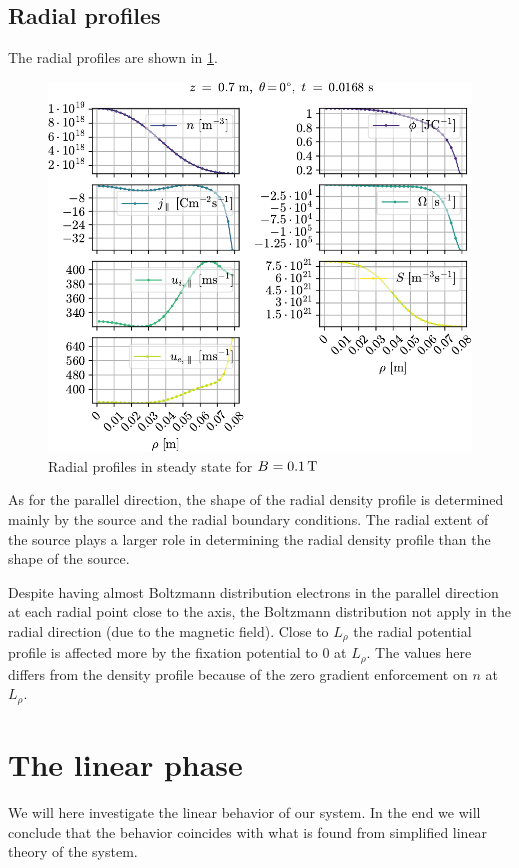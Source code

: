 \subsection{Radial profiles}
%
The radial profiles are shown in \cref{fig:radProfs}.
%
\begin{figure}[htb]
    \centering
    \includegraphics{fig/results/1DProfiles/B010Rad}
    \caption{Radial profiles in steady state for $B=0.1\, \text{T}$}
    \label{fig:radProfs}
\end{figure}
%
As for the parallel direction, the shape of the radial density profile is determined mainly by the source and the radial boundary conditions.
The radial extent of the source plays a larger role in determining the radial density profile than the shape of the source.

Despite having almost Boltzmann distribution electrons in the parallel direction at each radial point close to the axis, the Boltzmann distribution not apply in the radial direction (due to the magnetic field).
Close to $L_\rho$ the radial potential profile is affected more by the fixation potential to $0$ at $L_\rho$.
The values here differs from the density profile because of the zero gradient enforcement on $n$ at $L_\rho$.

\section{The linear phase}
%
We will here investigate the linear behavior of our system.
In the end we will conclude that the behavior coincides with what is found from simplified linear theory of the system.

